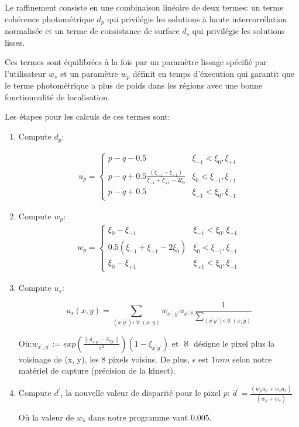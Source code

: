 \documentclass[a4paper,12pt]{article}
\begin{document}
Le raffinement consiste en une combinaison linéaire de deux termes: un
terme cohérence photométrique $d_p$ qui privilégie les solutions à
haute intercorrélation normalisée et un terme de consistance de
surface $d_s$ qui privilégie les solutions lisses.

Ces termes sont équilibrées à la fois par un paramètre lissage
spécifié par l'utilisateur $w_s$ et un paramètre $w_p$ définit en temps
d'éxecution qui garantit que le terme photométrique a plus de poids
dans les régions avec une bonne fonctionnalité de localisation.

Les étapes pour les calculs de ces termes sont:
\begin{enumerate}
\item Compute $d_p$:

\begin{eqnarray*}
u_{p}=\begin{cases}
p - q - 0.5 & \xi_{-1}<\xi_{0},\xi_{+1}\\
p - q + 0.5\frac{(\xi_{-1}-\xi_{-1})}{\xi_{-1}+\xi_{+1}-2\xi_{0}} &
\xi_{0}<\xi_{-1},\xi_{+1}\\ 
p - q + 0.5 & \xi_{+1}<\xi_{0},\xi_{-1}
\end{cases}
\end{eqnarray*}

\item Compute $w_p$:
\begin{eqnarray*}
w_{p}=\begin{cases}
\xi_{0}-\xi_{-1} & \xi_{-1}<\xi_{0},\xi_{+1}\\
0.5(\xi_{-1}+\xi_{+1}-2\xi_{0}) & \xi_{0}<\xi_{-1},\xi_{+1}\\
\xi_{0}-\xi_{+1} & \xi_{+1}<\xi_{0},\xi_{-1}
\end{cases}
\end{eqnarray*}

\item Compute $u_s$:

\[
u_{s}(x,y)=\sum_{(x^{'}y^{'})\epsilon\aleph(x,y)}w_{x^{'},y^{'}}u_{x^{',y^{'}}}\frac{1}{\sum_{(x^{'}y^{'})\epsilon\aleph(x,y)}} 
\]

Où:$w_{x^{'},y^{'}}:=exp\left(\frac{\parallel\delta_{x^{'}y^{'}}-\delta_{xy}\parallel}{\sigma^{2}}\right)(1-\xi_{x^{'}y^{'}})$
et $\aleph$ désigne le pixel plus la voisinage de (x, y), les 8 pixels
voisins. De plus, $\epsilon$ est $1mm$ selon notre matériel de capture
(précision de la kinect). 

\item Compute $d^{'}$, la nouvelle valeur de disparité pour le pixel $p$:
$d^{'}=\frac{(w_{p}u_{p}+w_{s}u_{s})}{(w_{p}+w_{s})}$

Où la valeur de $w_{s}$ dans notre programme vaut $0.005$.

\end{enumerate}
\end{document}
